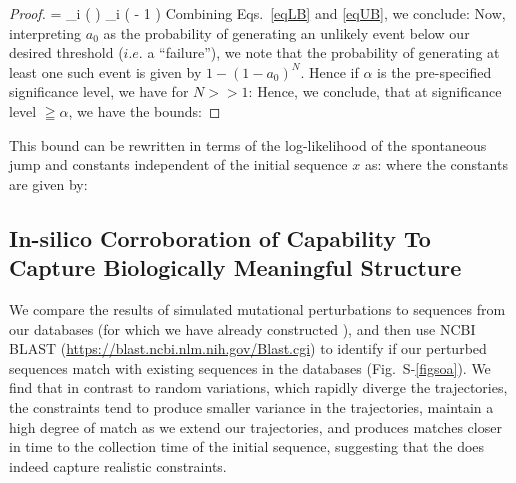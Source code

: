 {\begin{proof}
{  = \sum_i \log  \left  (    \right ) \leqq \sum_i \left  (  - 1 \right ) \leqq {}\theta
}%
Combining Eqs.~\ref{eqLB} and \ref{eqUB}, we conclude:
%
Now, interpreting $a_0$ as the probability of generating an unlikely event below our desired threshold ($i.e.$ a ``failure''), we note that the probability of generating at least one such event is given by $1-(1-a_0)^N$. Hence if $\alpha$ is the pre-specified significance level, we have for $N >> 1 $:
%
Hence, we conclude, that at significance level $\geqq \alpha$, we have the bounds:
%
\end{proof}
\begin{rem}
This bound can be rewritten in terms of the log-likelihood of the spontaneous jump and  constants independent of the  initial sequence $x$ as:
%
where the constants are given by:
%
\end{rem}


\subsection*{In-silico Corroboration of  Capability To Capture Biologically Meaningful Structure}
We compare the results of simulated mutational perturbations to sequences from our databases (for which we have already constructed ), and then use NCBI BLAST (\href{https://blast.ncbi.nlm.nih.gov/Blast.cgi}{https://blast.ncbi.nlm.nih.gov/Blast.cgi}) to identify  if  our perturbed sequences match with existing sequences in the databases (\SUPPLEMENTARY Fig.~S-\ref{figsoa}). We find that in contrast to random variations, which rapidly diverge the trajectories, the \tnet constraints tend to produce smaller variance in the trajectories, maintain a high degree of match as we extend our trajectories, and produces matches closer in time to the collection time of the  initial sequence, suggesting that the \tnet  does indeed capture realistic constraints.


}

